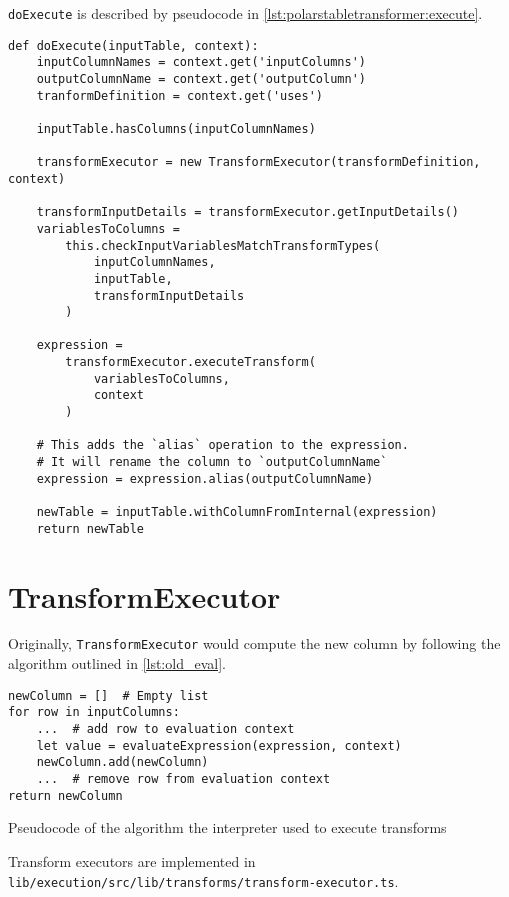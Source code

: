 \Verb|doExecute| is described by pseudocode in \ref{lst:polarstabletransformer:execute}.
\begin{listing}
	\begin{verbatim}
def doExecute(inputTable, context):
	inputColumnNames = context.get('inputColumns')
	outputColumnName = context.get('outputColumn')
	tranformDefinition = context.get('uses')

	inputTable.hasColumns(inputColumnNames)

	transformExecutor = new TransformExecutor(transformDefinition, context)

	transformInputDetails = transformExecutor.getInputDetails()
	variablesToColumns =
		this.checkInputVariablesMatchTransformTypes(
			inputColumnNames,
			inputTable,
			transformInputDetails
		)

	expression =
		transformExecutor.executeTransform(
			variablesToColumns,
			context
		)

	# This adds the `alias` operation to the expression.
	# It will rename the column to `outputColumnName`
	expression = expression.alias(outputColumnName)

	newTable = inputTable.withColumnFromInternal(expression)
	return newTable
	\end{verbatim}
	\caption{}
	\label{lst:polarstabletransformer:execute}
\end{listing}



\section{TransformExecutor}
\label{section:impl:transforms}
Originally, \Verb|TransformExecutor| would compute the new column by following the algorithm outlined in \ref{lst:old_eval}.


\begin{listing}
	\begin{verbatim}
newColumn = []  # Empty list
for row in inputColumns:
	...  # add row to evaluation context
	let value = evaluateExpression(expression, context)
	newColumn.add(newColumn)
	...  # remove row from evaluation context
return newColumn
	\end{verbatim}
	\caption{Pseudocode of the algorithm the interpreter used to execute transforms}
	\label{lst:old_eval}
\end{listing}


Transform executors are implemented in \Verb|lib/execution/src/lib/transforms/transform-executor.ts|.


